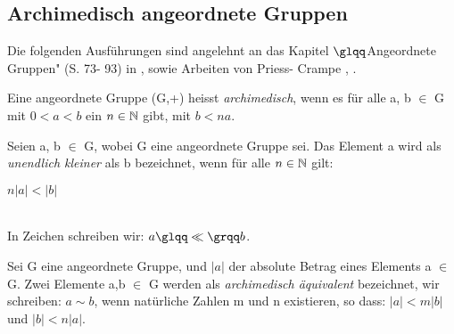 \subsection{Archimedisch angeordnete Gruppen}
%
Die folgenden Ausführungen sind angelehnt an das Kapitel $\glqq$Angeordnete Gruppen" (S. 73- 93) in \cite{fuchs66}, sowie Arbeiten von Priess- Crampe \cite{priesscrampe69}, \cite{priesscrampe83}.
%
\begin{defn}\label{archim}
Eine angeordnete Gruppe (G,+) heisst \textit{archimedisch}, wenn es für alle a, b $\in$ G  mit $0 < a < b$ ein $n \in \mathbb{N} $ gibt, mit $b < na$.
\end{defn}
%
%
\begin{defn}\label{uek}
Seien a, b $\in$ G, wobei G eine angeordnete Gruppe sei. Das Element a wird als \textit{unendlich kleiner} als b bezeichnet, wenn für alle $  n \in \mathbb{N} $ gilt: \\
\centerline{$n|a| < |b|$} \\
In Zeichen schreiben wir: $a \glqq \ll \grqq b$.
\end{defn}
%
\begin{defn}\label{aae}
Sei G eine angeordnete Gruppe, und $|a|$ der absolute Betrag eines Elements a $\in$ G. Zwei Elemente a,b $\in$ G werden als \textit{archimedisch äquivalent} bezeichnet, wir schreiben: $ a \sim b $, wenn natürliche Zahlen m und n existieren, so dass: 
$|a| < m|b| $ und $|b| < n|a|$. 
\end{defn}
%
